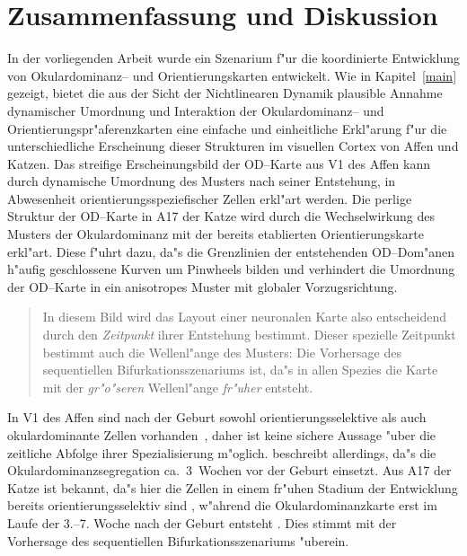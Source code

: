 \section{Zusammenfassung und Diskussion}
\label{zusammenfassung}
\thispagestyle{plain}

In der vorliegenden Arbeit wurde ein Szenarium f"ur die koordinierte
Entwicklung von Okulardominanz-- und Orientierungskarten entwickelt.  Wie
in Kapitel~\ref{main} gezeigt, bietet die aus der Sicht der Nichtlinearen
Dynamik plausible Annahme dynamischer Umordnung und Interaktion der
Okulardominanz-- und Orientierungspr"aferenzkarten eine einfache und
einheitliche Erkl"arung f"ur die unterschiedliche Erscheinung dieser
Strukturen im visuellen Cortex von Affen und Katzen.  Das streifige
Erscheinungsbild der OD--Karte aus V1 des Affen kann durch dynamische
Umordnung des Musters nach seiner Entstehung, in Abwesenheit
orientierungsspeziefischer Zellen erkl"art werden.  Die perlige Struktur
der OD--Karte in A17 der Katze wird durch die Wechselwirkung des Musters
der Okulardominanz mit der bereits etablierten Orientierungskarte
erkl"art. Diese f"uhrt dazu, da"s die Grenzlinien der entstehenden
OD--Dom"anen h"aufig geschlossene Kurven um Pinwheels bilden und verhindert
die Umordnung der OD--Karte in ein anisotropes Muster mit globaler
Vorzugsrichtung.

\begin{quote}
In diesem Bild wird das Layout einer neuronalen Karte also
entscheidend durch den \emph{Zeitpunkt} ihrer Entstehung bestimmt.  Dieser
spezielle Zeitpunkt bestimmt auch die Wellenl"ange des Musters: Die
Vorhersage des sequentiellen Bifurkationsszenariums ist, da"s in allen Spezies
die Karte mit der \emph{gr"o"seren} Wellenl"ange \emph{fr"uher} entsteht.
\end{quote}

In V1 des Affen sind nach der Geburt sowohl orientierungsselektive als auch
okulardominante Zellen vorhanden~\cite{blakemore:1978}, daher ist keine sichere
Aussage "uber die zeitliche Abfolge ihrer Spezialisierung m"oglich.
 beschreibt allerdings, da"s die
Okulardominanzsegregation ca.~3~Wochen vor der Geburt einsetzt. Aus
A17 der Katze ist bekannt, da"s hier die Zellen in einem fr"uhen
Stadium der Entwicklung bereits orientierungsselektiv sind
, w"ahrend 
die Okulardominanzkarte erst im Laufe der 3.--7. Woche nach der Geburt entsteht
\cite{shatz:1978,levay:1979}. Dies stimmt mit der Vorhersage des
sequentiellen Bifurkationsszenariums "uberein.


